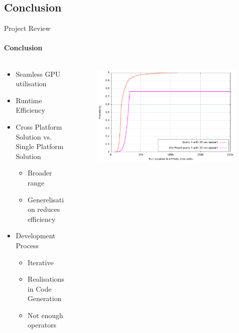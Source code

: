 	\subsection{Conclusion}
	\begin{frame}[t]{Project Review}\framesubtitle{Conclusion}
	\begin{columns}[T]
	\begin{column}{0.48\textwidth}
		\begin{itemize}
			\item Seamless GPU utilisation
			\item Runtime Efficiency
			\item Cross Platform Solution vs. Single Platform Solution
			\begin{itemize}
				\item Broader range
				\item Generelisation reduces efficiency
			\end{itemize}
			\item Development Process
			\begin{itemize}
				\item Iterative
				\item Realisations in Code Generation
				\item Not enough operators
			\end{itemize}
		\end{itemize}
	\end{column}
	\begin{column}{.48\textwidth}
      \begin{figure}
         \includegraphics[width=1\textwidth]{images/graph.pdf}

\end{figure}
\end{column}
\end{columns}
\end{frame}
